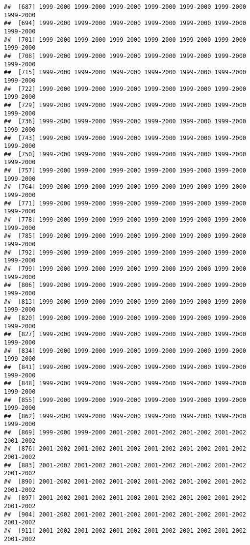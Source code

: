 \documentclass[
]{article}
\begin{document}
\begin{verbatim}
##  [687] 1999-2000 1999-2000 1999-2000 1999-2000 1999-2000 1999-2000 1999-2000
##  [694] 1999-2000 1999-2000 1999-2000 1999-2000 1999-2000 1999-2000 1999-2000
##  [701] 1999-2000 1999-2000 1999-2000 1999-2000 1999-2000 1999-2000 1999-2000
##  [708] 1999-2000 1999-2000 1999-2000 1999-2000 1999-2000 1999-2000 1999-2000
##  [715] 1999-2000 1999-2000 1999-2000 1999-2000 1999-2000 1999-2000 1999-2000
##  [722] 1999-2000 1999-2000 1999-2000 1999-2000 1999-2000 1999-2000 1999-2000
##  [729] 1999-2000 1999-2000 1999-2000 1999-2000 1999-2000 1999-2000 1999-2000
##  [736] 1999-2000 1999-2000 1999-2000 1999-2000 1999-2000 1999-2000 1999-2000
##  [743] 1999-2000 1999-2000 1999-2000 1999-2000 1999-2000 1999-2000 1999-2000
##  [750] 1999-2000 1999-2000 1999-2000 1999-2000 1999-2000 1999-2000 1999-2000
##  [757] 1999-2000 1999-2000 1999-2000 1999-2000 1999-2000 1999-2000 1999-2000
##  [764] 1999-2000 1999-2000 1999-2000 1999-2000 1999-2000 1999-2000 1999-2000
##  [771] 1999-2000 1999-2000 1999-2000 1999-2000 1999-2000 1999-2000 1999-2000
##  [778] 1999-2000 1999-2000 1999-2000 1999-2000 1999-2000 1999-2000 1999-2000
##  [785] 1999-2000 1999-2000 1999-2000 1999-2000 1999-2000 1999-2000 1999-2000
##  [792] 1999-2000 1999-2000 1999-2000 1999-2000 1999-2000 1999-2000 1999-2000
##  [799] 1999-2000 1999-2000 1999-2000 1999-2000 1999-2000 1999-2000 1999-2000
##  [806] 1999-2000 1999-2000 1999-2000 1999-2000 1999-2000 1999-2000 1999-2000
##  [813] 1999-2000 1999-2000 1999-2000 1999-2000 1999-2000 1999-2000 1999-2000
##  [820] 1999-2000 1999-2000 1999-2000 1999-2000 1999-2000 1999-2000 1999-2000
##  [827] 1999-2000 1999-2000 1999-2000 1999-2000 1999-2000 1999-2000 1999-2000
##  [834] 1999-2000 1999-2000 1999-2000 1999-2000 1999-2000 1999-2000 1999-2000
##  [841] 1999-2000 1999-2000 1999-2000 1999-2000 1999-2000 1999-2000 1999-2000
##  [848] 1999-2000 1999-2000 1999-2000 1999-2000 1999-2000 1999-2000 1999-2000
##  [855] 1999-2000 1999-2000 1999-2000 1999-2000 1999-2000 1999-2000 1999-2000
##  [862] 1999-2000 1999-2000 1999-2000 1999-2000 1999-2000 1999-2000 1999-2000
##  [869] 1999-2000 1999-2000 2001-2002 2001-2002 2001-2002 2001-2002 2001-2002
##  [876] 2001-2002 2001-2002 2001-2002 2001-2002 2001-2002 2001-2002 2001-2002
##  [883] 2001-2002 2001-2002 2001-2002 2001-2002 2001-2002 2001-2002 2001-2002
##  [890] 2001-2002 2001-2002 2001-2002 2001-2002 2001-2002 2001-2002 2001-2002
##  [897] 2001-2002 2001-2002 2001-2002 2001-2002 2001-2002 2001-2002 2001-2002
##  [904] 2001-2002 2001-2002 2001-2002 2001-2002 2001-2002 2001-2002 2001-2002
##  [911] 2001-2002 2001-2002 2001-2002 2001-2002 2001-2002 2001-2002 2001-2002

\end{verbatim}
\end{document}
